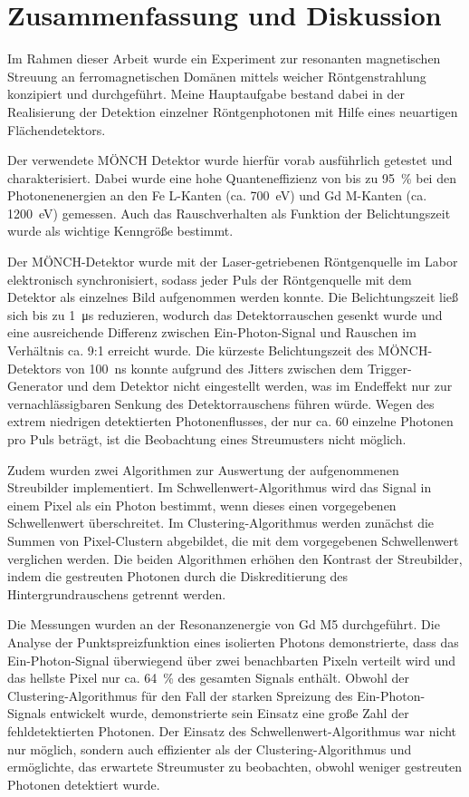 \chapter{Zusammenfassung und Diskussion}
Im Rahmen dieser Arbeit wurde ein Experiment zur resonanten magnetischen Streuung an ferromagnetischen Domänen mittels weicher Röntgenstrahlung konzipiert und durchgeführt. Meine Hauptaufgabe bestand dabei in der Realisierung der Detektion einzelner Röntgenphotonen mit Hilfe eines neuartigen Flächendetektors.

\noindent
Der verwendete MÖNCH Detektor wurde hierfür vorab ausführlich getestet und charakterisiert. Dabei wurde eine hohe Quanteneffizienz von bis zu \SI{95}{\percent} bei den Photonenenergien an den Fe L-Kanten (ca. \SI{700}{\eV}) und Gd M-Kanten (ca. \SI{1200}{\eV}) gemessen. Auch das Rauschverhalten als Funktion der Belichtungszeit wurde als wichtige Kenngröße bestimmt.

\noindent
Der MÖNCH-Detektor wurde mit der Laser-getriebenen Röntgenquelle im Labor elektronisch synchronisiert, sodass jeder Puls der Röntgenquelle mit dem Detektor als einzelnes Bild aufgenommen werden konnte. Die Belichtungszeit ließ sich bis zu \SI{1}{\micro\second} reduzieren, wodurch das Detektorrauschen gesenkt wurde und eine ausreichende Differenz zwischen Ein-Photon-Signal und Rauschen im Verhältnis ca. 9:1 erreicht wurde. Die kürzeste Belichtungszeit des MÖNCH-Detektors von \SI{100}{\nano\second} konnte aufgrund des Jitters zwischen dem Trigger-Generator und dem Detektor nicht eingestellt werden, was im Endeffekt nur zur vernachlässigbaren Senkung des Detektorrauschens führen würde. Wegen des extrem niedrigen detektierten Photonenflusses, der nur ca. 60 einzelne Photonen pro Puls beträgt, ist die Beobachtung eines Streumusters nicht möglich.

\noindent
Zudem wurden zwei Algorithmen zur Auswertung der aufgenommenen Streubilder implementiert. Im Schwellenwert-Algorithmus wird das Signal in einem Pixel als ein Photon bestimmt, wenn dieses einen vorgegebenen Schwellenwert überschreitet. Im Clustering-Algorithmus werden zunächst die Summen von Pixel-Clustern abgebildet, die mit dem vorgegebenen Schwellenwert verglichen werden. Die beiden Algorithmen erhöhen den Kontrast der Streubilder, indem die gestreuten Photonen durch die Diskreditierung des Hintergrundrauschens getrennt werden.

\noindent
Die Messungen wurden an der Resonanzenergie von Gd M5 durchgeführt. Die Analyse der Punktspreizfunktion eines isolierten Photons demonstrierte, dass das Ein-Photon-Signal überwiegend über zwei benachbarten Pixeln verteilt wird und das hellste Pixel nur ca. \SI{64}{\percent} des gesamten Signals enthält. Obwohl der Clustering-Algorithmus für den Fall der starken Spreizung des Ein-Photon-Signals entwickelt wurde, demonstrierte sein Einsatz eine große Zahl der fehldetektierten Photonen. Der Einsatz des Schwellenwert-Algorithmus war nicht nur möglich, sondern auch effizienter als der Clustering-Algorithmus und ermöglichte, das erwartete Streumuster zu beobachten, obwohl weniger gestreuten Photonen detektiert wurde.  

